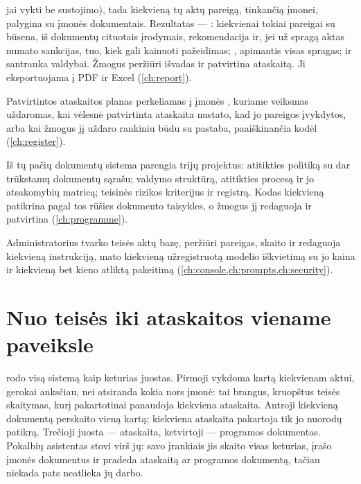 \begin{description}
    jai vykti be sustojimo), tada kiekvieną tų aktų pareigą, tinkančią įmonei, palygina su
    įmonės dokumentais. Rezultatas --- : kiekvienai tokiai pareigai
     su būsena, iš dokumentų cituotais įrodymais, rekomendacija ir, jei už spragą
    aktas numato sankcijas, tuo, kiek gali kainuoti pažeidimas; ,
    apimantis visas spragas; ir santrauka valdybai.
    Žmogus peržiūri išvadas ir patvirtina ataskaitą. Ji eksportuojama į PDF ir Excel
    (\cref{ch:report}).
  \item[Seka veiksmus laike.] Patvirtintos ataskaitos planas perkeliamas į įmonės
    , kuriame veiksmas uždaromas, kai vėlesnė patvirtinta ataskaita
    nustato, kad jo pareigos įvykdytos, arba kai žmogus jį uždaro rankiniu būdu su pastaba,
    paaiškinančia kodėl (\cref{ch:register}).
  \item[Rengia atitikties programos dokumentų projektus.] Iš tų pačių dokumentų sistema parengia
    trijų  projektus: atitikties politiką su dar trūkstamų dokumentų sąrašu;
    valdymo struktūrą, atitikties procesą ir jo atsakomybių matricą; teisinės rizikos
    kriterijus ir registrą. Kodas kiekvieną patikrina pagal tos rūšies dokumento taisykles, o
    žmogus jį redaguoja ir patvirtina (\cref{ch:programme}).
  \item[Rodo, kaip veikia pati.] Administratorius tvarko teisės aktų bazę, peržiūri pareigas,
    skaito ir redaguoja kiekvieną instrukciją, mato kiekvieną užregistruotą modelio
    iškvietimą su jo kaina ir kiekvieną bet kieno atliktą pakeitimą
    (\cref{ch:console,ch:prompts,ch:security}).
\end{description}

\section{Nuo teisės iki ataskaitos viename paveiksle}\label{sec:intro:picture}

 rodo visą sistemą kaip keturias juostas. Pirmoji vykdoma kartą
kiekvienam aktui, gerokai anksčiau, nei atsiranda kokia nors įmonė: tai brangus, kruopštus
teisės skaitymas, kurį pakartotinai panaudoja kiekviena ataskaita. Antroji kiekvieną
dokumentą perskaito vieną kartą; kiekviena ataskaita pakartoja tik jo nuorodų patikrą.
Trečioji juosta --- ataskaita, ketvirtoji --- programos dokumentas. Pokalbių asistentas
stovi virš jų: savo įrankiais jis skaito visas keturias, įrašo įmonės dokumentus ir pradeda
ataskaitą ar programos dokumentą, tačiau niekada pats neatlieka jų darbo.

